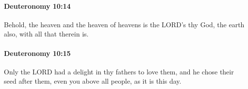 		\paragraph{Deuteronomy 10:14} %
			\label{DEUTERONOMY-10-14}

			Behold, the heaven and the heaven of heavens is the LORD's thy God, the earth also, with all that therein is.


		\paragraph{Deuteronomy 10:15} %
			\label{DEUTERONOMY-10-15}

			Only the LORD had a delight in thy fathers to love them, and he chose their seed after them, even you above all people, as it is this day.


